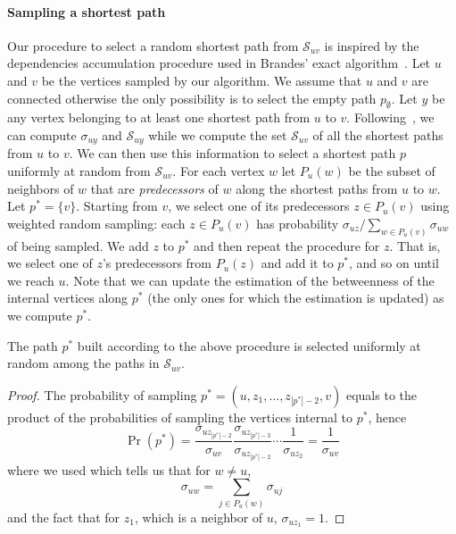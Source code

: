 \paragraph{Sampling a shortest path}
Our procedure to select a random shortest path from $\mathcal{S}_{uv}$ is
inspired by the dependencies accumulation procedure used in Brandes' exact
algorithm~\citep{Brandes01}. 
Let $u$ and $v$ be the vertices sampled by our algorithm. We assume that $u$ and
$v$ are connected otherwise the only possibility is to select the empty path
$p_\emptyset$. Let $y$ be any vertex belonging to at least one shortest path
from $u$ to $v$. Following~\citet{Brandes01}, we can compute $\sigma_{uy}$ and
$\mathcal{S}_{uy}$ while we compute the set $\mathcal{S}_{uv}$ of all the
shortest paths from $u$ to $v$. We can then use this information to select a
shortest path $p$ uniformly at random from $\mathcal{S}_{uv}$. For each vertex
$w$ let $P_u(w)$ be the subset of neighbors of $w$ that are \emph{predecessors}
of $w$ along the shortest paths from $u$ to $w$. Let $p^*=\{v\}$. Starting from
$v$, we select one of its predecessors $z\in P_u(v)$ using weighted random
sampling: each $z\in P_u(v)$ has probability $\sigma_{uz}/\sum_{w\in
P_u(v)}\sigma_{uw}$ of being sampled. We add $z$ to $p^*$ and then repeat the
procedure for $z$. That is, we select one of $z$'s predecessors from $P_u(z)$ and add it
to $p^*$, and so on until we reach $u$. Note that we can update the estimation
of the betweenness of the internal vertices along $p^*$ (the only ones for which
the estimation is updated) as we compute $p^*$.

\begin{lemma}\label{lem:samplpath}
  The path $p^*$ built according to the above procedure is selected uniformly at
  random among the paths in $\mathcal{S}_{uv}$.
\end{lemma}

\begin{proof}
  The probability of sampling $p^*=(u,z_1,\dotsc,z_{|p^*|-2},v)$ equals to the
  product of the probabilities of sampling the vertices internal to $p^*$, hence
  \[
  \Pr(p^*)=\frac{\sigma_{uz_{|p^*|-2}}}{\sigma_{uv}}\frac{\sigma_{uz_{|p^*|-3}}}{\sigma_{uz_{|p^*|-2}}}\dotsb
  \frac{1}{\sigma_{uz_2}}=\frac{1}{\sigma_{uv}}
  \]
  where we used \citep[Lemma3]{Brandes01} which tells us that for $w\neq u$,
  \[
  \sigma_{uw}=\sum_{j\in P_u(w)}\sigma_{uj}
  \]
  and the fact that for $z_1$, which is a neighbor of $u$, $\sigma_{uz_1}=1$.
\end{proof}


